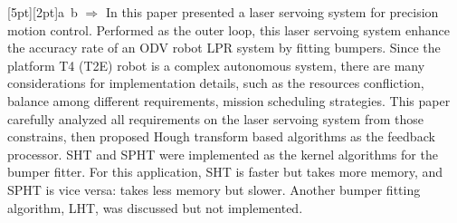\documentclass{article}
\begin{document}
\mbox{\tiny \raisebox{0pt}[5pt][2pt]{a} b}
\makebox[0pt]{\raisebox{5pt}{a}}\hspace{-0.5em}$\Rightarrow$ 
    \pagecolor[rgb]{0.89,1.00,0.69}
    \textcolor[rgb]{0.00,0.00,0.50}{
    In this paper presented a laser servoing system for precision motion control. Performed as the outer loop, this laser servoing system enhance the accuracy rate of an ODV robot LPR system by fitting bumpers. Since the platform T4 (T2E) robot is a complex autonomous system, there are many considerations for implementation details, such as the resources confliction, balance among different requirements, mission scheduling strategies. This paper carefully analyzed all requirements on the laser servoing system from those constrains, then proposed Hough transform based algorithms as the feedback processor. SHT and SPHT were implemented as the kernel algorithms for the bumper fitter. For this application, SHT is faster but takes more memory, and SPHT is vice versa: takes less memory but slower. Another bumper fitting algorithm, LHT, was discussed but not implemented. }
\end{document}
